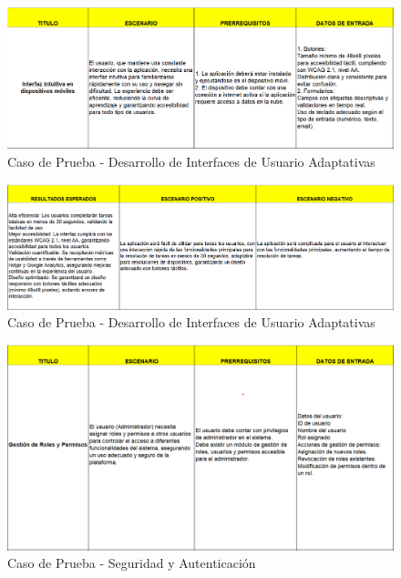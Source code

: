\documentclass[12pt,letterpaper,spanish, xcolor=table]{report}
\numberwithin{figure}{subsection}
\begin{document}
	\begin{figure}[H]
		\centering
		\includegraphics[width=1.0\textwidth]
		{Imagenes/PathAyuda/CPInterfaces.png}
		\caption{Caso de Prueba - Desarrollo de Interfaces de Usuario Adaptativas 
		}\label{a2}
	\end{figure}
	
	\begin{figure}[H]
		\centering
		\includegraphics[width=1.0\textwidth]
		{Imagenes/PathAyuda/CPInterfaces2.png}
		\caption{Caso de Prueba - Desarrollo de Interfaces de Usuario Adaptativas
		}\label{a2}
	\end{figure}
	
	\begin{figure}[H]
		\centering
		\includegraphics[width=1.0\textwidth]
		{Imagenes/PathAyuda/CPSeguridadAutenticacion.png}
		\caption{Caso de Prueba - Seguridad y  Autenticación
		}\label{a2}
	\end{figure}
	
\end{document}
